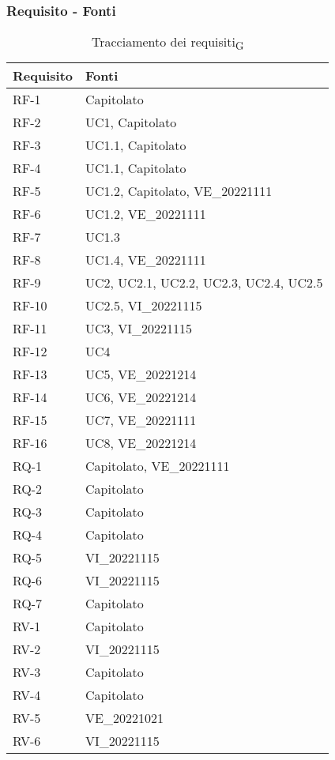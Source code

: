 \subsubsection{Requisito - Fonti}
\begin{table}[H]
	\centering
	\begin{tabular}{| p{} | p{} |} 
		\hline
		\textbf{Requisito} & \textbf{Fonti} \\
		\hline
		RF-1 & Capitolato\\
		\hline
		RF-2 & UC1, Capitolato\\
		\hline
		RF-3 & UC1.1, Capitolato\\
		\hline
		RF-4 & UC1.1, Capitolato\\
		\hline
		RF-5 & UC1.2, Capitolato, VE\_20221111\\
		\hline
		RF-6 & UC1.2, VE\_20221111\\
		\hline
		RF-7 & UC1.3\\
		\hline
		RF-8 & UC1.4, VE\_20221111\\
		\hline
		RF-9 & UC2, UC2.1, UC2.2, UC2.3, UC2.4, UC2.5\\
		\hline
		RF-10 & UC2.5, VI\_20221115\\
         \hline
		RF-11 & UC3, VI\_20221115\\
        \hline
		RF-12 & UC4\\
         \hline
		RF-13 & UC5, VE\_20221214\\
        \hline
		RF-14 & UC6, VE\_20221214\\
         \hline
		RF-15 & UC7, VE\_20221111\\
         \hline
		RF-16 & UC8, VE\_20221214\\
		\hline
		RQ-1 & Capitolato, VE\_20221111\\
		\hline
		RQ-2 & Capitolato\\
		\hline
		RQ-3 & Capitolato\\
		\hline
		RQ-4 & Capitolato\\
		\hline
		RQ-5 & VI\_20221115\\
		\hline
		RQ-6 & VI\_20221115\\
		\hline
		RQ-7 & Capitolato\\
		\hline
		RV-1 & Capitolato\\
		\hline
		RV-2 & VI\_20221115\\
		\hline
		RV-3 & Capitolato\\
		\hline
		RV-4 & Capitolato\\
		\hline
		RV-5 & VE\_20221021\\
		\hline
		RV-6 & VI\_20221115\\
		\hline
	\end{tabular}
	\caption{Tracciamento dei requisiti\textsubscript{G}}
\end{table}

